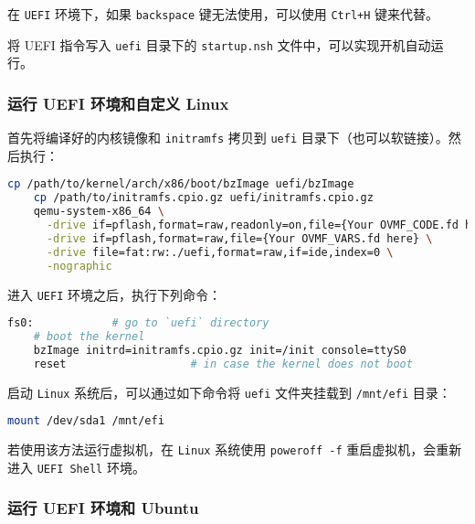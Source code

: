 \begin{remark}
    在 \texttt{UEFI} 环境下，如果 \texttt{backspace} 键无法使用，可以使用 \texttt{Ctrl+H} 键来代替。
\end{remark}

\begin{remark}
    将 UEFI 指令写入 \texttt{uefi} 目录下的 \texttt{startup.nsh} 文件中，可以实现开机自动运行。
\end{remark}


\subsubsection{运行 UEFI 环境和自定义 Linux}

首先将编译好的内核镜像和 \texttt{initramfs} 拷贝到 \texttt{uefi} 目录下（也可以软链接）。然后执行：

\begin{lstlisting}[language=bash]
    cp /path/to/kernel/arch/x86/boot/bzImage uefi/bzImage
    cp /path/to/initramfs.cpio.gz uefi/initramfs.cpio.gz
    qemu-system-x86_64 \
      -drive if=pflash,format=raw,readonly=on,file={Your OVMF_CODE.fd here} \
      -drive if=pflash,format=raw,file={Your OVMF_VARS.fd here} \
      -drive file=fat:rw:./uefi,format=raw,if=ide,index=0 \
      -nographic
\end{lstlisting}

进入 \texttt{UEFI} 环境之后，执行下列命令：

\begin{lstlisting}[language=bash]
    fs0:            # go to `uefi` directory
    # boot the kernel
    bzImage initrd=initramfs.cpio.gz init=/init console=ttyS0
    reset                   # in case the kernel does not boot
\end{lstlisting}

启动 \texttt{Linux} 系统后，可以通过如下命令将 \texttt{uefi} 文件夹挂载到 \texttt{/mnt/efi} 目录：

\begin{lstlisting}[language=bash]
    mount /dev/sda1 /mnt/efi
\end{lstlisting}

若使用该方法运行虚拟机，在 \texttt{Linux} 系统使用 \texttt{poweroff -f} 重启虚拟机，会重新进入 \texttt{UEFI Shell} 环境。

\subsubsection{运行 UEFI 环境和 Ubuntu}

